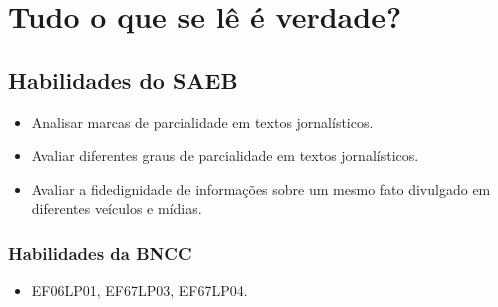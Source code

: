 

\chapter{Tudo o que se lê é verdade?}

\vspace*{-.5cm}
\enlargethispage{2\baselineskip}

\section*{Habilidades do SAEB}
\begin{itemize}
\item Analisar marcas de parcialidade em textos
jornalísticos. 
\item Avaliar diferentes graus de parcialidade em textos
jornalísticos. 
\item Avaliar a fidedignidade de informações sobre um mesmo
fato divulgado em diferentes veículos e mídias.
\end{itemize}

\subsection*{Habilidades da BNCC}
\begin{itemize}
\item EF06LP01, EF67LP03, EF67LP04.
\end{itemize}

